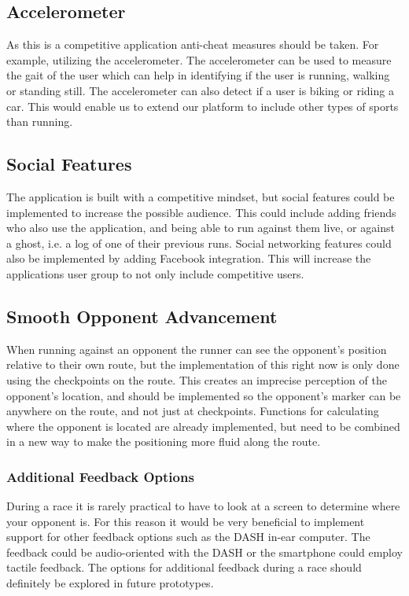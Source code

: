\subsection{Accelerometer}
As this is a competitive application anti-cheat measures should be taken. For example, utilizing the accelerometer. The accelerometer can be used to measure the gait of the user which can help in identifying if the user is running, walking or standing still. The accelerometer can also detect if a user is biking or riding a car. This would enable us to extend our platform to include other types of sports than running.

\subsection{Social Features}
The application is built with a competitive mindset, but social features could be implemented to increase the possible audience.
This could include adding friends who also use the application, and being able to run against them live, or against a ghost, i.e. a log of one of their previous runs.
Social networking features could also be implemented by adding Facebook integration.
This will increase the applications user group to not only include competitive users.

\subsection{Smooth Opponent Advancement}
When running against an opponent the runner can see the opponent's position relative to their own route, but the implementation of this right now is only done using the checkpoints on the route. This creates an imprecise perception of the opponent's location, and should be implemented so the opponent's marker can be anywhere on the route, and not just at checkpoints. Functions for calculating where the opponent is located are already implemented, but need to be combined in a new way to make the positioning more fluid along the route.

\subsubsection{Additional Feedback Options}
During a race it is rarely practical to have to look at a screen to determine where your opponent is. For this reason it would be very beneficial to implement support for other feedback options such as the DASH in-ear computer. The feedback could be audio-oriented with the DASH or the smartphone could employ tactile feedback. The options for additional feedback during a race should definitely be explored in future prototypes. 